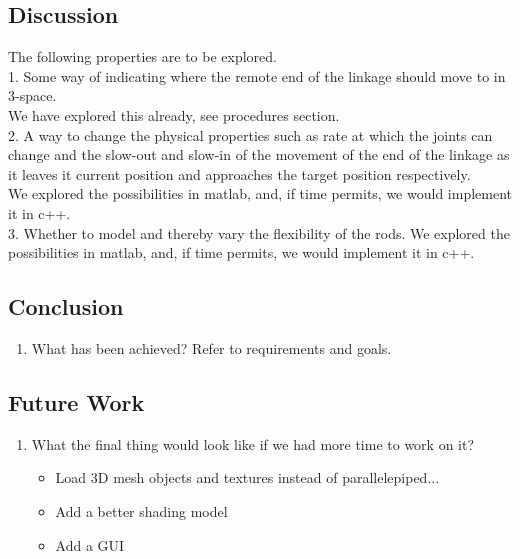 \documentclass[paper=a4, fontsize=11pt]{scrartcl} %
\numberwithin{equation}{section} %
\numberwithin{figure}{section} %
\numberwithin{table}{section} %
\begin{document}
\subsection{Discussion}
The following properties are to be explored.\\

1. Some way of indicating where the remote end of the linkage should move to in 3-space.\\
We have explored this already, see procedures section.\\

2. A way to change the physical properties such as rate at which the joints can change and the slow-out and slow-in of the movement of the end of the linkage as it leaves it current position and approaches the target position respectively.\\
We explored the possibilities in matlab, and, if time permits, we would implement it in c++.\\


3. Whether to model and thereby vary the flexibility of the rods.
We explored the possibilities in matlab, and, if time permits, we would implement it in c++.\\



\subsection{Conclusion}

\begin{enumerate}
\item What has been achieved? Refer to requirements and goals.
\end{enumerate}

\subsection{Future Work}
\begin{enumerate}
\item What the final thing would look like if we had more time to work on it?

\begin{itemize}
	\item Load 3D mesh objects and textures instead of parallelepiped...
	\item Add a better shading model
	\item Add a GUI
\end{itemize}
\end{enumerate}

\nocite{Fedor2003}
\nocite{Welman1993}
\nocite{Crai55}
{}

\end{document}
